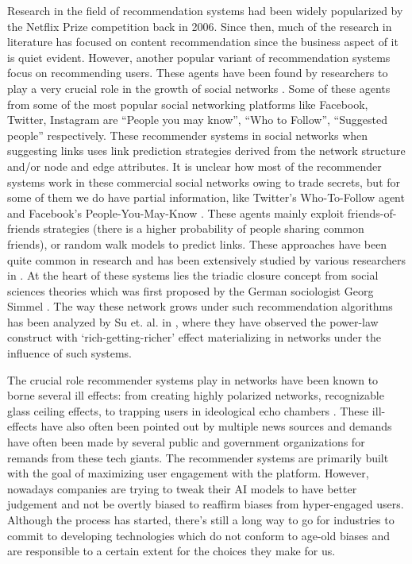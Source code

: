 Research in the field of recommendation systems had been widely popularized by the Netflix Prize competition \cite{netflixprize2006} back in 2006. Since then, much of the research in literature has focused on content recommendation since the business aspect of it is quiet evident. However, another popular variant of recommendation systems focus on recommending users. These agents have been found by researchers to play a very crucial role in the growth of social networks \cite{su2016effect,daly2010network,stoica2018algorithmic}. Some of these agents from some of the most popular social networking platforms like Facebook, Twitter, Instagram are ``People you may know'', ``Who to Follow'', ``Suggested people'' respectively. These recommender systems in social networks when suggesting links uses link prediction strategies derived from the network structure and/or node and edge attributes. It is unclear how most of the recommender systems work in these commercial social networks owing to trade secrets, but for some of them we do have partial information, like Twitter's Who-To-Follow agent \cite{gupta2013wtf} and Facebook's People-You-May-Know \cite{backstrom2011supervised}. These agents mainly exploit friends-of-friends strategies (there is a higher probability of people sharing common friends), or random walk models to predict links. These approaches have been quite common in research and has been extensively studied by various researchers in \cite{backstrom2011supervised,chen2009make,gupta2013wtf}. At the heart of these systems lies the triadic closure concept from social sciences theories which was first proposed by the German sociologist Georg Simmel \cite{simmel1950sociology}. The way these network grows under such recommendation algorithms has been analyzed by Su et. al. in \cite{su2016effect}, where they have observed the power-law construct with `rich-getting-richer' effect materializing in networks under the influence of such systems.

The crucial role recommender systems play in networks have been known to borne several ill effects: from creating highly polarized networks, recognizable glass ceiling effects, to trapping users in ideological echo chambers \cite{stoica2018algorithmic}. These ill-effects have also often been pointed out by multiple news sources \cite{youtubefeed2020,guardianselfharm,youtuberabbit2020} and demands have often been made by several public and government organizations for remands from these tech giants. The recommender systems are primarily built with the goal of maximizing user engagement with the platform. However, nowadays companies are trying to tweak their AI models to have better judgement and not be overtly biased to reaffirm biases from hyper-engaged users. Although the process has started, there's still a long way to go for industries to commit to developing technologies which do not conform to age-old biases and are responsible to a certain extent for the choices they make for us.

